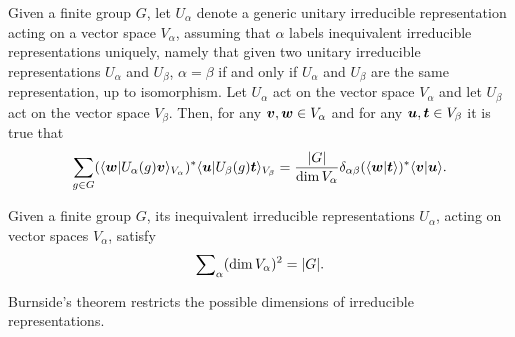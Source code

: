 \begin{teo}
    Given a finite group $G$, let $U_\alpha$ denote a generic unitary irreducible representation acting on a vector space $V_\alpha$, assuming that $\alpha$ labels inequivalent irreducible representations uniquely, namely that given two unitary irreducible representations $U_\alpha$ and $U_\beta$, $\alpha = \beta$ if and only if $U_\alpha$ and $U_\beta$ are the same representation, up to isomorphism. Let $U_\alpha$ act on the vector space $V_\alpha$ and let $U_\beta$ act on the vector space $V_\beta$. Then, for any $\bm{v},\bm{w} \in V_\alpha$ and for any $\bm{u},\bm{t} \in V_\beta$ it is true that
    \begin{equation}
        \sum_{g \in G}(\langle \bm{w} | U_\alpha(g)\bm{v} \rangle_{V_\alpha})^*\langle \bm{u} | U_\beta(g)\bm{t} \rangle_{V_\beta} = \frac{|G|}{\dim{V_\alpha}}\delta_{\alpha\beta}(\langle \bm{w} | \bm{t} \rangle)^*\langle \bm{v} | \bm{u} \rangle.
    \end{equation}
\end{teo}
\begin{teo}
\label{teo: Burnside's theorem}
    Given a finite group $G$, its inequivalent irreducible representations $U_\alpha$, acting on vector spaces $V_\alpha$, satisfy
    \begin{equation}
        \sum\nolimits_\alpha(\dim{V_\alpha})^2 = |G|.
    \end{equation}
\end{teo}
Burnside's theorem restricts the possible dimensions of irreducible representations.

